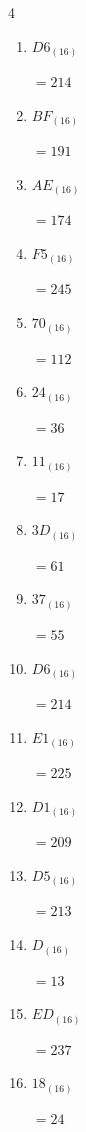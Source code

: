 \begin{multicols}{4}
\begin{enumerate}
        $=176$

  \item $D6_{(16)}$

        $=214$

  \item $BF_{(16)}$

        $=191$

  \item $AE_{(16)}$

        $=174$

  \item $F5_{(16)}$

        $=245$

  \item $70_{(16)}$

        $=112$

  \item $24_{(16)}$

        $=36$

  \item $11_{(16)}$

        $=17$

  \item $3D_{(16)}$

        $=61$

  \item $37_{(16)}$

        $=55$

\columnbreak %

  \item $D6_{(16)}$

        $=214$

  \item $E1_{(16)}$

        $=225$

  \item $D1_{(16)}$

        $=209$

  \item $D5_{(16)}$

        $=213$

  \item $D_{(16)}$

        $=13$

  \item $ED_{(16)}$

        $=237$

  \item $18_{(16)}$

        $=24$


\end{enumerate}
\end{multicols}
